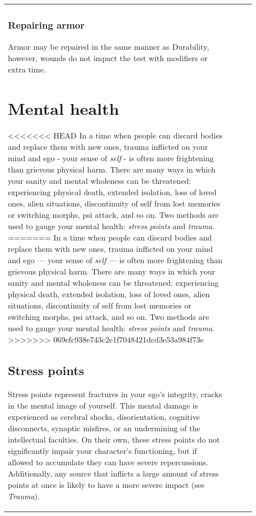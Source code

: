 \begin{table}
\begin{tabular}{|p{8cm}|r|r|r|}
\subsubsection{Repairing armor} 

Armor may be repaired in the same manner as Durability, however, wounds do not impact the test with modifiers or extra time. 

\section{Mental health} \label{sec:mental-health} 

<<<<<<< HEAD In a time when people can discard bodies and replace them with new ones, trauma inflicted on your mind and ego - your sense of \emph{self} - is often more frightening than grievous physical harm. There are many ways in which your sanity and mental wholeness can be threatened: experiencing physical death, extended isolation, loss of loved ones, alien situations, discontinuity of self from lost memories or switching morphs, psi attack, and so on. Two methods are used to gauge your mental health: \emph{stress points} and \emph{trauma}. ======= In a time when people can discard bodies and replace them with new ones, trauma inflicted on your mind and ego --- your sense of \emph{self} --- is often more frightening than grievous physical harm. There are many ways in which your sanity and mental wholeness can be threatened: experiencing physical death, extended isolation, loss of loved ones, alien situations, discontinuity of self from lost memories or switching morphs, psi attack, and so on. Two methods are used to gauge your mental health: \emph{stress points} and \emph{trauma}. >>>>>>> 069efc938e743c2e1f7048421dcd3e53a984f73e 



\subsection{Stress points} \label{sec:stress-points} 

Stress points represent fractures in your ego’s integrity, cracks in the mental image of yourself. This mental damage is experienced as cerebral shocks, disorientation, cognitive disconnects, synaptic misfires, or an undermining of the intellectual faculties. On their own, these stress points do not significantly impair your character’s functioning, but if allowed to accumulate they can have severe repercussions. Additionally, any source that inflicts a large amount of stress points at once is likely to have a more severe impact (see \emph{Trauma}). 


\end{tabular}
\end{table}
